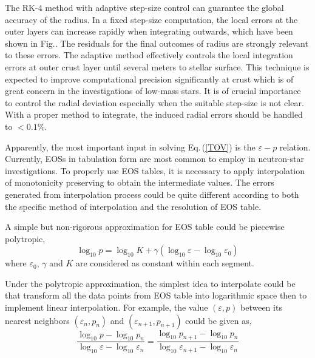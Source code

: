 \documentclass[preprint,tightenlines,eqsecnum,floats,aps,amsmath,amssymb,nofootinbib,prd,showpacs]{revtex4}
\begin{document}

The RK-4 method with adaptive step-size control can guarantee the global accuracy of the radius. In a fixed step-size computation, the local errors at the outer layers can increase rapidly when integrating outwards, which have been shown in Fig.. The residuals for the final outcomes of radius are strongly relevant to these errors. The adaptive method effectively controls the local integration errors at outer crust layer until several meters to stellar surface. This technique is expected to improve computational precision significantly at crust which is of great concern in the investigations of low-mass stars. It is of crucial importance to control the radial deviation especially when the suitable step-size is not clear. With a proper method to integrate, the induced radial errors should be handled to $< 0.1\%$.

Apparently, the most important input in solving Eq.$\,$(\ref{TOV}) is the $\varepsilon - p$ relation. Currently, EOSs in tabulation form are most common to employ in neutron-star investigations. To properly use EOS tables, it is necessary to apply interpolation of monotonicity preserving to obtain the intermediate values. The errors generated from interpolation process could be quite different according to both the specific method of interpolation and the resolution of EOS table.

A simple but non-rigorous approximation for EOS table could be piecewise polytropic,
\begin{equation} \label{polytropicEOS}
{\log _{10}}p = {\log _{10}}K + \gamma \left( {{{\log }_{10}}\varepsilon  - {{\log }_{10}}{\varepsilon _0}} \right)
\end{equation}
where $\varepsilon_0$, $\gamma$ and $K$ are considered as constant within each segment.

Under the polytropic approximation, the simplest idea to interpolate could be that transform all the data points from EOS table into logarithmic space then to implement linear interpolation. For example, the value $(\varepsilon , p)$ between its nearest neighbors $(\varepsilon_n , p_n)$ and $(\varepsilon_{n+1} , p_{n+1})$ could be given as,
\begin{equation} \label{linearinterp}
\frac{{{{\log }_{10}}p - {{\log }_{10}}{p_n}}}{{{{\log }_{10}}\varepsilon  - {{\log }_{10}}{\varepsilon _n}}} = \frac{{{{\log }_{10}}{p_{n + 1}} - {{\log }_{10}}{p_n}}}{{{{\log }_{10}}{\varepsilon _{n + 1}} - {{\log }_{10}}{\varepsilon _n}}}
\end{equation}
\end{document}
